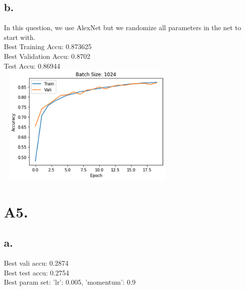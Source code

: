 \documentclass{article}
\begin{document}
\subsection*{b.}
In this question, we use AlexNet but we randomize all parameters in the net to start with. \\
Best Training Accu:  0.873625 \\
Best Validation Accu:  0.8702 \\
Test Accu: 0.86944 \\

\includegraphics[width=9cm, height=6cm]{plots/A4b.png}


\section*{A5. }

\subsection*{a.}
Best vali accu: 0.2874 \\
Best test accu: 0.2754 \\
Best param set: {'lr': 0.005, 'momentum': 0.9} \\
\end{document}
